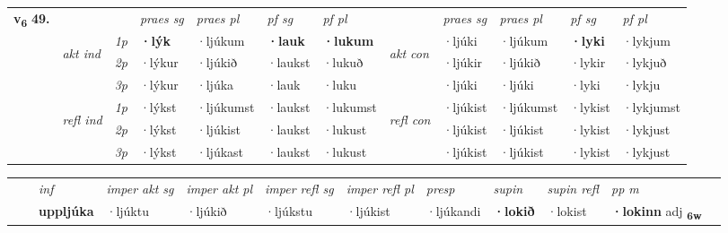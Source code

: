\begin{tabular}{llllllllllll} \toprule
\multirow{4}{*}{{{\textbf{v{\textsubscript{6}}} \Large{\textbf{49.}}}}}  & &   &  \textit{praes sg}  & \textit{praes pl}  &\textit{ pf sg} & \textit{pf pl} &  &  \textit{praes sg}  & \textit{praes pl}  & \textit{pf sg} & \textit{pf pl } \\*
	\cmidrule{4-7} \cmidrule{9-12}
 & \multirow{3}{*}{\begin{turn}{90}\textit{akt ind}\end{turn}} & {\textit{1p}} & \textbf{·lýk} & ·ljúkum    & \textbf{·lauk} & \textbf{·lukum} & \multirow{3}{*}{\begin{turn}{90}\textit{akt con}\end{turn}} &·ljúki & ·ljúkum & \textbf{·lyki} & ·lykjum\\*
& &  {\textit{2p}} &  ·lýkur  & ·ljúkið   & ·laukst & ·lukuð & & ·ljúkir & ·ljúkið & ·lykir & ·lykjuð \\*
& &  {\textit{3p}} & ·lýkur & ·ljúka   & ·lauk & ·luku & & ·ljúki & ·ljúki& ·lyki & ·lykju  \\*
\cmidrule{4-7} \cmidrule{9-12}
 &\multirow{3}{*}{\begin{turn}{90}\textit{refl ind}\end{turn}} & {\textit{1p}} & ·lýkst & ·ljúkumst    & ·laukst & ·lukumst & \multirow{3}{*}{\begin{turn}{90}\textit{refl con}\end{turn}}  &·ljúkist & ·ljúkumst & ·lykist & ·lykjumst\\*
 &&  {\textit{2p}} &  ·lýkst  & ·ljúkist   & ·laukst & ·lukust & &·ljúkist & ·ljúkist & ·lykist & ·lykjust \\*
& &  {\textit{3p}} & ·lýkst & ·ljúkast   & ·laukst & ·lukust & & ·ljúkist & ·ljúkist& ·lykist & ·lykjust  \\*
\cmidrule{4-7} \cmidrule{9-12}
\end{tabular}


\begin{tabular}{llllllllllll}
 & & \textit{inf} & \textit{imper akt sg} & \textit{imper akt pl} & \textit{imper refl sg} & \textit{imper refl pl} & \textit{presp} & \textit{supin} & \textit{supin refl} & \textit{pp m}     \\*
  & & \textbf{uppljúka} & ·ljúktu  & ·ljúkið & ·ljúkstu & ·ljúkist & ·ljúkandi &  \textbf{·lokið} & ·lokist & \textbf{·lokinn} adj \textbf{\textsubscript{6w}} \\*
\cmidrule{1-12}
\end{tabular}



